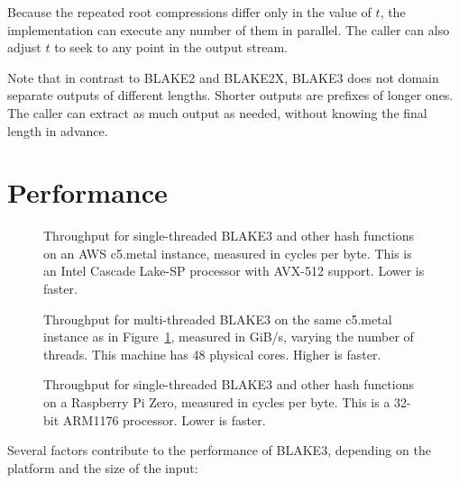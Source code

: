 \documentclass[11pt,notitlepage,a4paper]{article}
\begin{document}
Because the repeated root compressions differ only in the value of $t$, the
implementation can execute any number of them in parallel. The caller can also
adjust $t$ to seek to any point in the output stream.

Note that in contrast to BLAKE2 and BLAKE2X, BLAKE3 does not domain separate
outputs of different lengths. Shorter outputs are prefixes of longer ones. The
caller can extract as much output as needed, without knowing the final length
in advance.

\section{Performance}\label{sec:performance}

\begin{figure}[h]
\centering

\caption{Throughput for single-threaded BLAKE3 and other hash functions on an
    AWS c5.metal instance, measured in cycles per byte. This is an Intel
    Cascade Lake-SP processor with AVX-512 support. Lower is faster.}%
\label{fig:avx512}
\end{figure}

\begin{figure}[h]
\centering

    \caption{Throughput for multi-threaded BLAKE3 on the same c5.metal instance
    as in Figure~\ref{fig:avx512}, measured in GiB/s, varying the number of
    threads. This machine has 48 physical cores. Higher is faster.}%
\label{fig:threads}
\end{figure}

\begin{figure}[h]
\centering
%

\caption{Throughput for single-threaded BLAKE3 and other hash functions on a
    Raspberry Pi Zero, measured in cycles per byte. This is a 32-bit ARM1176
    processor. Lower is faster.}%
\label{fig:rpizero}
\end{figure}

Several factors contribute to the performance of BLAKE3, depending on the
platform and the size of the input:
\end{document}

